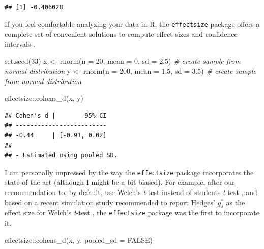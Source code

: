 \documentclass[
  oneside]{krantz}
\makeatletter
\newenvironment{Shaded}{\begin{snugshade}}{\end{snugshade}}
\newcommand{\AttributeTok}[1]{\textcolor[rgb]{0.61,0.61,0.61}{#1}}
\newcommand{\CommentTok}[1]{\textcolor[rgb]{0.37,0.37,0.37}{\textit{#1}}}
\newcommand{\ConstantTok}[1]{\textcolor[rgb]{0,0,0}{#1}}
\newcommand{\DecValTok}[1]{\textcolor[rgb]{0.06,0.06,0.06}{#1}}
\newcommand{\FloatTok}[1]{\textcolor[rgb]{0.06,0.06,0.06}{#1}}
\newcommand{\FunctionTok}[1]{\textcolor[rgb]{0,0,0}{#1}}
\newcommand{\NormalTok}[1]{#1}
\newcommand{\OtherTok}[1]{\textcolor[rgb]{0.37,0.37,0.37}{#1}}
\newcommand{\SpecialCharTok}[1]{\textcolor[rgb]{0,0,0}{#1}}
\newenvironment{kframe}{%
\medskip{}
\setlength{\fboxsep}{.8em}
 \def\at@end@of@kframe{}%
 \ifinner\ifhmode%
  \def\at@end@of@kframe{\end{minipage}}%
  \begin{minipage}{\columnwidth}%
 \fi\fi%
 \def\FrameCommand##1{\hskip\@totalleftmargin \hskip-\fboxsep
 \colorbox{shadecolor}{##1}\hskip-\fboxsep
     \hskip-\linewidth \hskip-\@totalleftmargin \hskip\columnwidth}%
 \MakeFramed {\advance\hsize-\width
   \@totalleftmargin\z@ \linewidth\hsize
   \@setminipage}}%
 {\par\unskip\endMakeFramed%
 \at@end@of@kframe}
\renewenvironment{Shaded}{\begin{kframe}}{\end{kframe}}
\makeatother
\begin{document}
\begin{verbatim}
## [1] -0.406028
\end{verbatim}

If you feel comfortable analyzing your data in R, the \texttt{effectsize} package offers a complete set of convenient solutions to compute effect sizes and confidence intervals \citep{ben-shachar_effectsize_2020}.

\begin{Shaded}
\begin{Highlighting}[]
\FunctionTok{set.seed}\NormalTok{(}\DecValTok{33}\NormalTok{)}
\NormalTok{x }\OtherTok{\textless{}{-}} \FunctionTok{rnorm}\NormalTok{(}\AttributeTok{n =} \DecValTok{20}\NormalTok{, }\AttributeTok{mean =} \DecValTok{0}\NormalTok{, }\AttributeTok{sd =} \FloatTok{2.5}\NormalTok{) }\CommentTok{\# create sample from normal distribution}
\NormalTok{y }\OtherTok{\textless{}{-}} \FunctionTok{rnorm}\NormalTok{(}\AttributeTok{n =} \DecValTok{200}\NormalTok{, }\AttributeTok{mean =} \FloatTok{1.5}\NormalTok{, }\AttributeTok{sd =} \FloatTok{3.5}\NormalTok{) }\CommentTok{\# create sample from normal distribution}

\NormalTok{effectsize}\SpecialCharTok{::}\FunctionTok{cohens\_d}\NormalTok{(x, y)}
\end{Highlighting}
\end{Shaded}

\begin{verbatim}
## Cohen's d |        95% CI
## -------------------------
## -0.44     | [-0.91, 0.02]
## 
## - Estimated using pooled SD.
\end{verbatim}

I am personally impressed by the way the \texttt{effectsize} package incorporates the state of the art (although I might be a bit biased). For example, after our recommendation to, by default, use Welch's \emph{t}-test instead of students \emph{t}-test \citep{delacre_why_2017}, and based on a recent simulation study recommended to report Hedges' \(g_s^*\) as the effect size for Welch's \emph{t}-test \citep{delacre_why_2021}, the \texttt{effectsize} package was the first to incorporate it.

\begin{Shaded}
\begin{Highlighting}[]
\NormalTok{effectsize}\SpecialCharTok{::}\FunctionTok{cohens\_d}\NormalTok{(x, y, }\AttributeTok{pooled\_sd =} \ConstantTok{FALSE}\NormalTok{)}
\end{Highlighting}
\end{Shaded}
\end{document}
